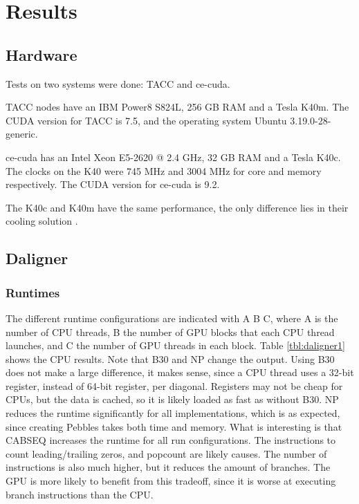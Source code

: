 \documentclass[../main/thesis.tex]{subfiles}
\begin{document}
\chapter{Results}
\ifdefined\main
\newcommand{\codePath}{5_results/code/}
\newcommand{\figPath}{5_results/figures/}
\else

\fi

\section{Hardware}
Tests on two systems were done: TACC and ce-cuda.

TACC nodes have an IBM Power8 S824L, 256 GB RAM and a Tesla K40m.
The CUDA version for TACC is 7.5, and the operating system Ubuntu 3.19.0-28-generic.

ce-cuda has an Intel Xeon E5-2620 @ 2.4 GHz, 32 GB RAM and a Tesla K40c.
The clocks on the K40 were 745 MHz and 3004 MHz for core and memory respectively.
The CUDA version for ce-cuda is 9.2.

The K40c and K40m have the same performance, the only difference lies in their cooling solution \cite{K40m}.

\section{Daligner}
\subsection{Runtimes}
The different runtime configurations are indicated with A B C, where A is the number of CPU threads, B the number of GPU blocks that each CPU thread launches, and C the number of GPU threads in each block.
Table \ref{tbl:daligner1} shows the CPU results.
Note that B30 and NP change the output.
Using B30 does not make a large difference, it makes sense, since a CPU thread uses a 32-bit register, instead of 64-bit register, per diagonal.
Registers may not be cheap for CPUs, but the data is cached, so it is likely loaded as fast as without B30.
NP reduces the runtime significantly for all implementations, which is as expected, since creating Pebbles takes both time and memory.
What is interesting is that CABSEQ increases the runtime for all run configurations.
The instructions to count leading/trailing zeros, and popcount are likely causes.
The number of instructions is also much higher, but it reduces the amount of branches.
The GPU is more likely to benefit from this tradeoff, since it is worse at executing branch instructions than the CPU.
\end{document}
